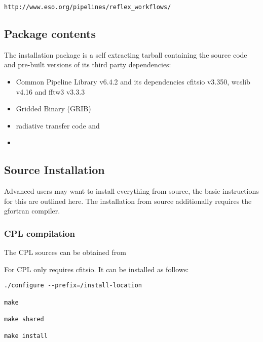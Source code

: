 \texttt{http://www.eso.org/pipelines/reflex\_workflows/}

\subsection{Package contents}
\label{sec:pkgcontents}

The installation package is a self extracting tarball containing the
\mf{} source code and pre-built versions of its third party
dependencies:

\begin{itemize}
  \item
    Common Pipeline Library v6.4.2 and its dependencies cfitsio v3.350,
    wcslib v4.16 and fftw3 v3.3.3 \cite{CPL}
  \item
    Gridded Binary (GRIB) \gribv{} \cite{WGRIB}
  \item
    radiative transfer code \lnflv{} and \lblrtmv{} \cite{LBLRTM}
  \item
    \aerv{} \cite{AER}
\end{itemize}


\subsection{Source Installation}
\label{sec:sourceinstall}

Advanced users may want to install everything from source, the basic
instructions for this are outlined here. The installation from source
additionally requires the gfortran compiler.

\subsubsection{CPL compilation}

The CPL sources can be obtained from \cite{CPL}

For \mf{} CPL only requires cfitsio. It can be installed as follows:

\begin{verbatim}
./configure --prefix=/install-location

make

make shared

make install
\end{verbatim}

